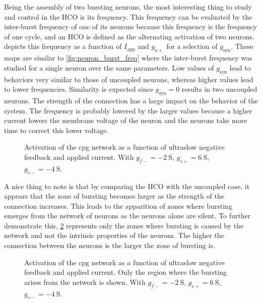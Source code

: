 Being the assembly of two bursting neurons, the most interesting thing to study and control in the HCO is its frequency.
This frequency can be evaluated by the inter-burst frequency of one of its neurons because this frequency is the frequency of one cycle, and an HCO is defined as the alternating activation of two neurons.
 depicts this frequency as a function of $I_\text{app}$ and $g_{u+}$ for a selection of $g_\text{syn}$.
These maps are similar to \cref{fig:neuron_burst_freq} where the inter-burst frequency was studied for a single neuron over the same parameters.
Low values of $g_\text{syn}$ lead to behaviors very similar to those of uncoupled neurons, whereas higher values lead to lower frequencies.
Similarity is expected since $g_\text{syn} = 0$ results in two uncoupled neurons.
The strength of the connection has a large impact on the behavior of the system.
The frequency is probably lowered by the larger values because a higher current lowers the membrane voltage of the neuron and the neurons take more time to correct this lower voltage.

\begin{figure}[!htb]
    \centering
    \caption{Activation of the cpg network as a function of ultraslow negative feedback and applied current. With $g_{f-}=\qty{-2}{\siemens}$, $g_{s+}=\qty{6}{\siemens}$, $g_{s-}=\qty{-4}{\siemens}$.}
    \label{fig:cpg_act}
\end{figure}

A nice thing to note is that by comparing the HCO with the uncoupled case, it appears that the zone of bursting becomes larger as the strength of the connection increases.
This leads to the apparition of zones where bursting emerges from the network of neurons as the neurons alone are silent.
To further demonstrate this, \cref{fig:cpg_only_act} represents only the zones where bursting is caused by the network and not the intrinsic properties of the neurons.
The higher the connection between the neurons is the larger the zone of bursting is.

\begin{figure}[!htb]
    \centering
    \caption{Activation of the cpg network as a function of ultraslow negative feedback and applied current. Only the region where the bursting arises from the network is shown. With $g_{f-}=\qty{-2}{\siemens}$, $g_{s+}=\qty{6}{\siemens}$, $g_{s-}=\qty{-4}{\siemens}$.}
    \label{fig:cpg_only_act}
\end{figure}


